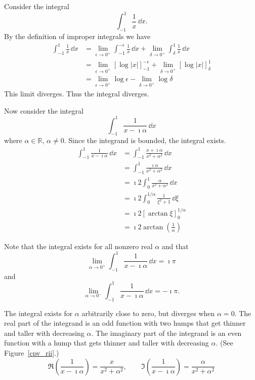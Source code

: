 {%
\begin{Solution}
  Consider the integral
  \[
  \int_{-1}^1 \frac{1}{x} \,\dd x.
  \]
  By the definition of improper integrals we have
  \begin{align*}
    \int_{-1}^1 \frac{1}{x} \,\dd x
    &= \lim_{\epsilon \to 0^+} \int_{-1}^{-\epsilon} \frac{1}{x} \,\dd x
    + \lim_{\delta \to 0^+} \int_{\delta}^1 \frac{1}{x} \,\dd x \\
    &= \lim_{\epsilon \to 0^+} \left[ \log|x| \right]_{-1}^{-\epsilon}
    + \lim_{\delta \to 0^+} \left[ \log|x| \right]_\delta^1 \\
    &= \lim_{\epsilon \to 0^+} \log \epsilon
    - \lim_{\delta \to 0^+} \log \delta
  \end{align*}
  This limit diverges.  Thus the integral diverges.

  Now consider the integral
  \[
  \int_{-1}^1 \frac{1}{x - \imath \alpha} \,\dd x
  \]
  where $\alpha \in \mathbb{R}$, $\alpha \neq 0$.  Since the integrand is bounded, 
  the integral exists.
  \begin{align*}
    \int_{-1}^1 \frac{1}{x - \imath \alpha} \,\dd x
    &= \int_{-1}^1 \frac{x + \imath \alpha}{x^2 + \alpha^2} \,\dd x \\
    &= \int_{-1}^1 \frac{\imath \alpha}{x^2 + \alpha^2} \,\dd x \\
    &= \imath 2 \int_0^1 \frac{\alpha}{x^2 + \alpha^2} \,\dd x \\
    &= \imath 2 \int_0^{1/\alpha} \frac{1}{\xi^2 + 1} \,\dd \xi \\
    &= \imath 2 \left[ \arctan \xi \right]_0^{1/\alpha} \\
    &= \imath 2 \arctan\left( \frac{1}{\alpha} \right)
  \end{align*}

  Note that the integral exists for all nonzero real $\alpha$ and that
  \[
  \lim_{\alpha \to 0^+} \int_{-1}^1 \frac{1}{x - \imath \alpha} \,\dd x = \imath \pi
  \]
  and
  \[
  \lim_{\alpha \to 0^-} \int_{-1}^1 \frac{1}{x - \imath \alpha} \,\dd x = - \imath \pi.
  \]

  The integral exists for $\alpha$ arbitrarily close to zero, but diverges 
  when $\alpha = 0$.  The real part of the integrand is an odd function 
  with two humps that get thinner and taller with decreasing $\alpha$.
  The imaginary part of the integrand is an even function with a hump
  that gets thinner and taller with decreasing $\alpha$.
  (See Figure~\ref{cpv_rii}.)
  \[
  \Re\left( \frac{1}{x - \imath \alpha} \right) = \frac{x}{x^2 + \alpha^2}, 
  \qquad
  \Im\left( \frac{1}{x - \imath \alpha} \right) = \frac{\alpha}{x^2 + \alpha^2}
  \]


\end{Solution}}
